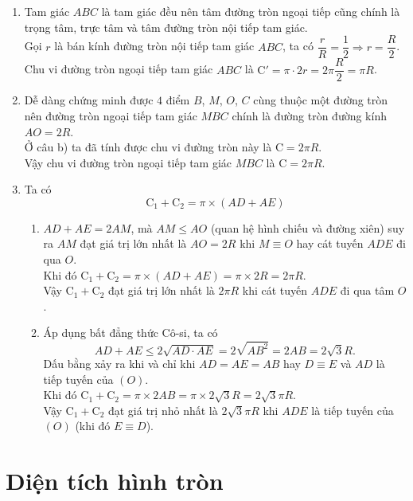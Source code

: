 \begin{bt}
{\begin{enumerate}
			Chu vi đường tròn ngoại tiếp tam giác $ABC$ là $\mathrm{C}=\pi \cdot 2R=2\pi R$.
			\item Tam giác $ABC$ là tam giác đều nên tâm đường tròn ngoại tiếp cũng chính là trọng tâm, trực tâm và tâm đường tròn nội tiếp tam giác.\\
			Gọi $r$ là bán kính đường tròn nội tiếp tam giác $ABC$, ta có $\dfrac{r}{R}=\dfrac{1}{2} \Rightarrow r = \dfrac{R}{2}$.\\
			Chu vi đường tròn ngoại tiếp tam giác $ABC$ là $\mathrm{C'}=\pi \cdot 2r=2\pi \dfrac{R}{2}=\pi R$.
			\item Dễ dàng chứng minh được $4$ điểm $B$, $M$, $O$, $C$ cùng thuộc một đường tròn nên đường tròn ngoại tiếp tam giác $MBC$ chính là đường tròn đường kính $AO=2R$.\\
			Ở câu b) ta đã tính được chu vi đường tròn này là $\mathrm{C}=2\pi R$.\\
			Vậy chu vi đường tròn ngoại tiếp tam giác $MBC$ là $\mathrm{C}=2\pi R$.
			\item Ta có
			\[ \mathrm{C}_1+\mathrm{C}_2 = \pi \times (AD+AE) \]
			\begin{enumerate}
				\item $AD+AE=2AM$, mà $AM \le AO$ (quan hệ hình chiếu và đường xiên) suy ra $AM$ đạt giá trị lớn nhất là $AO=2R$ khi $M \equiv O$ hay cát tuyến $ADE$ đi qua $O$.\\
				Khi đó $\mathrm{C}_1+\mathrm{C}_2 = \pi \times (AD+AE) = \pi \times 2R = 2\pi R$.\\
				Vậy $\mathrm{C}_1+\mathrm{C}_2$ đạt giá trị lớn nhất là $2\pi R$ khi cát tuyến $ADE$ đi qua tâm $O$.
				\item Áp dụng bất đẳng thức Cô-si, ta có
				\[ AD+AE \le 2 \sqrt{AD \cdot AE} = 2\sqrt{AB^2}=2AB=2\sqrt3 R.\]
				Dấu bằng xảy ra khi và chỉ khi $AD=AE=AB$ hay $D \equiv E$ và $AD$ là tiếp tuyến của $(O)$.\\
				Khi đó $\mathrm{C}_1+\mathrm{C}_2 = \pi \times 2AB = \pi \times 2\sqrt3 R =2\sqrt 3 \pi R $.\\
				Vậy $\mathrm{C}_1+\mathrm{C}_2$ đạt giá trị nhỏ nhất là $2\sqrt 3 \pi R$ khi $ADE$ là tiếp tuyến của $(O)$ (khi đó $E \equiv D$).
			\end{enumerate}	
		\end{enumerate}
	}
\end{bt}

\section{Diện tích hình tròn}
	
